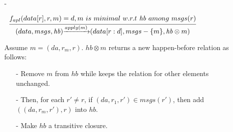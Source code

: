 \begin {itemize}
\begin{itemize}
    Assume message of $msgs'$ is in the form $(da,\_,\_)$. Let $msgs(r)$ be the set of messages of $msgs$ with destination replica identifier $r$. $\mathit{hb} \otimes msgs'$ returns a new happen-before relation as follows:

        \begin{itemize}
        \setlength{\itemsep}{0.5pt}
        \item[-] For each replica $r' \in \mathbb{R}$, in $msgs(r')$, if $(m_1,r) \in \mathit{hb}$, then remove $(m_1,r)$ from $\mathit{hb}$ and add $(m_1,(da,r,r'))$ into $\mathit{hb}$,

        \item[-] For each replica $r' \in \mathbb{R}$, if $m_1$ is maximal among $\{ (\_,r,r') \}$ w.r.t $\mathit{hb}$, then add $(m_1,(da,r,r'))$ into $\mathit{hb}$.

        \item[-] Make $\mathit{hb}$ a transitive closure.
        \end{itemize}

    \item[-]

        $\begin{array}{l c} \bigfrac{ f_{apl}(data[r],r,m) = d, m \ is \ minimal \ w.r.t \ \mathit{hb} \ among \ msgs(r) } {(data,msgs,\mathit{hb}) {\xrightarrow{apply(m)}} (data[r:d],msgs - \{ m \}, \mathit{hb} \otimes m )} \end{array}$

         Assume $m = (da,r_m,r)$. $\mathit{hb} \otimes m$ returns a new happen-before relation as follows:

        \begin{itemize}
        \setlength{\itemsep}{0.5pt}
        \item[-] Remove $m$ from $\mathit{hb}$ while keeps the relation for other elements unchanged.

        \item[-] Then, for each $r' \neq r$, if $(da,r_1,r') \in msgs(r')$, then add $((da,r_m,r'),r)$ into $\mathit{hb}$.

        \item[-] Make $\mathit{hb}$ a transitive closure.
        \end{itemize}
    \end{itemize}
\end{itemize}

